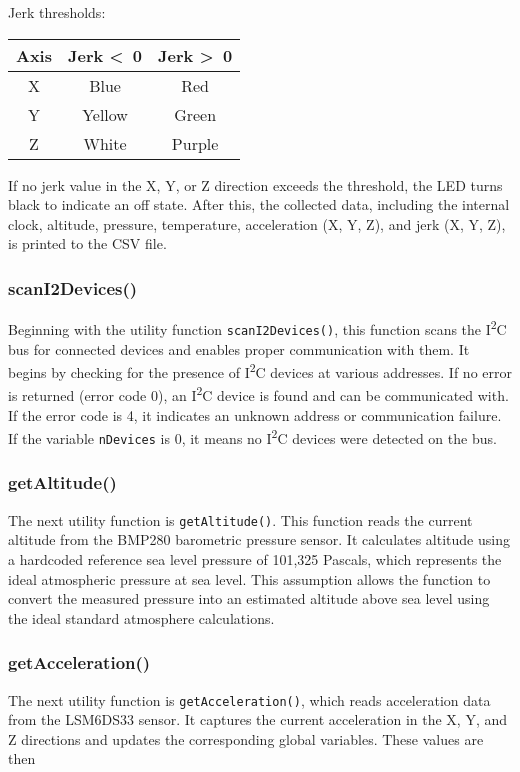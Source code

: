 \documentclass[12pt]{report}
\begin{document}
Jerk thresholds:
\begin{center}
\begin{tabular}{|c|c|c|}
\hline
\textbf{Axis} & \textbf{Jerk \textless\ 0} & \textbf{Jerk \textgreater\ 0} \\
\hline
X & Blue & Red \\
Y & Yellow & Green \\
Z & White & Purple \\
\hline
\end{tabular}
\end{center}

If no jerk value in the X, Y, or Z direction exceeds the threshold, the LED turns black to indicate an off state. After this, the collected data, including the internal clock, altitude, pressure, temperature, acceleration (X, Y, Z), and jerk (X, Y, Z), is printed to the CSV file.

\subsubsection*{scanI2Devices()}
Beginning with the utility function \texttt{scanI2Devices()}, this function scans the I\textsuperscript{2}C bus for connected devices and enables proper communication with them. It begins by checking for the presence of I\textsuperscript{2}C devices at various addresses. If no error is returned (error code 0), an I\textsuperscript{2}C device is found and can be communicated with. If the error code is 4, it indicates an unknown address or communication failure. If the variable \texttt{nDevices} is 0, it means no I\textsuperscript{2}C devices were detected on the bus.

\subsubsection*{getAltitude()}
The next utility function is \texttt{getAltitude()}. This function reads the current altitude from the BMP280 barometric pressure sensor. It calculates altitude using a hardcoded reference sea level pressure of 101{,}325 Pascals, which represents the ideal atmospheric pressure at sea level. This assumption allows the function to convert the measured pressure into an estimated altitude above sea level using the ideal standard atmosphere calculations.

\subsubsection*{getAcceleration()}
The next utility function is \texttt{getAcceleration()}, which reads acceleration data from the LSM6DS33 sensor. It captures the current acceleration in the X, Y, and Z directions and updates the corresponding global variables. These values are then
\end{document}
